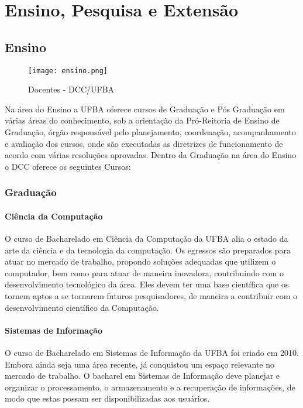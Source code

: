 \chapter{Ensino, Pesquisa e Extensão}

    \section{Ensino}
    
        \begin{wrapfigure}{L}{0.3\textwidth}
            \centering
            \texttt{[image: ensino.png]}
              \caption{Docentes - DCC/UFBA}
            \label{Rotulo}
        \end{wrapfigure}        
        Na área do Ensino a UFBA oferece cursos de Graduação e Pós Graduação em várias áreas do conhecimento, sob a orientação da Pró-Reitoria de Ensino de Graduação, órgão responsável pelo planejamento, coordenação, acompanhamento e avaliação dos cursos, onde são executadas as diretrizes de funcionamento de acordo com várias resoluções  aprovadas. Dentro da Graduação na área do Ensino o DCC oferece os seguintes Cursos:\newline
        
        
         \subsection{Graduação}
        
         \subsubsection*{Ciência da Computação}
    
    O curso de Bacharelado em Ciência da Computação da UFBA alia o estado da arte da ciência e da tecnologia da computação. Os egressos são preparados para atuar no mercado de trabalho, propondo soluções adequadas que utilizem o computador, bem como para atuar de maneira inovadora, contribuindo com o desenvolvimento tecnológico da área. Eles devem ter uma base científica que os tornem aptos a se tornarem futuros pesquisadores, de maneira a contribuir com o desenvolvimento científico da Computação. 
    
   
    \subsubsection*{Sistemas de Informação}
   O curso de Bacharelado em Sistemas de Informação da UFBA foi criado em 2010. Embora ainda seja uma área recente, já conquistou um espaço relevante no mercado de trabalho. O bacharel em Sistemas de Informação deve planejar e organizar o processamento, o armazenamento e a recuperação de informações, de modo que estas possam ser disponibilizadas aos usuários.
  
